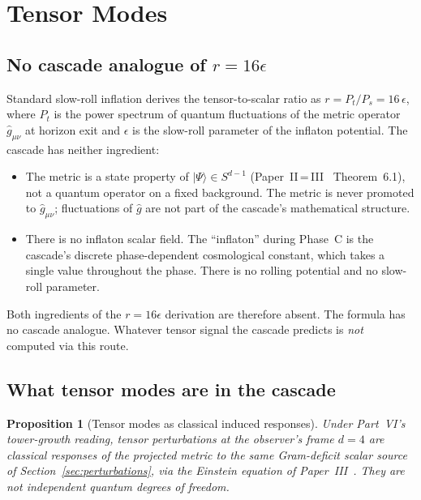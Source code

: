 \documentclass[12pt,a4paper]{article}
\newtheorem{proposition}[theorem]{Proposition}
\begin{document}
\section{Tensor Modes}
\label{sec:tensors}

\subsection{No cascade analogue of \texorpdfstring{$r = 16\epsilon$}{r = 16 epsilon}}

Standard slow-roll inflation derives the tensor-to-scalar ratio as
$r = P_t / P_s = 16\,\epsilon$, where $P_t$ is the power spectrum of quantum
fluctuations of the metric operator $\hat{g}_{\mu\nu}$ at horizon exit and
$\epsilon$ is the slow-roll parameter of the inflaton potential. The cascade
has neither ingredient:

\begin{itemize}[nosep]
\item The metric is a state property of $|\Psi\rangle \in S^{d-1}$
(Paper~II\,=\,III~\cite{part23} Theorem~6.1), not a quantum operator on
a fixed background. The metric is never promoted to $\hat{g}_{\mu\nu}$;
fluctuations of $\hat{g}$ are not part of the cascade's mathematical
structure.
\item There is no inflaton scalar field. The ``inflaton'' during Phase~C is
the cascade's discrete phase-dependent cosmological constant, which takes a
single value throughout the phase. There is no rolling potential and no
slow-roll parameter.
\end{itemize}

Both ingredients of the $r = 16\epsilon$ derivation are therefore absent. The
formula has no cascade analogue. Whatever tensor signal the cascade predicts
is \emph{not} computed via this route.

\subsection{What tensor modes are in the cascade}

\begin{proposition}[Tensor modes as classical induced responses]\label{prop:tensor-induced}
Under Part~VI's tower-growth reading, tensor perturbations at the observer's
frame $d = 4$ are classical responses of the projected metric to the same
Gram-deficit scalar source of Section~\ref{sec:perturbations}, via the
Einstein equation of Paper~III~\cite{part3}. They are not independent
quantum degrees of freedom.
\end{proposition}
\end{document}

